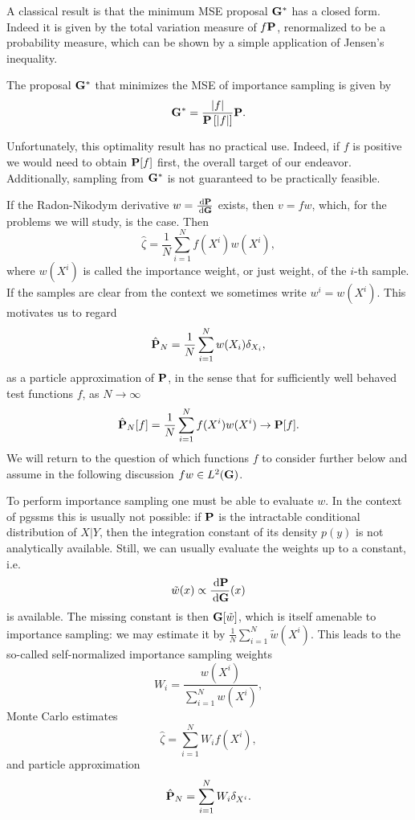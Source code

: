A classical result is that the minimum MSE proposal $\G^\ast$ has a closed form. Indeed it is given by the total variation measure of $f\P$, renormalized to be a probability measure, which can be shown by a simple application of Jensen's inequality. 
\begin{proposition}
    \label{prop:minimum_MSE_IS}
    The proposal $\G^{\ast}$ that minimizes the MSE of importance sampling is given by
    $$
    \G^{\ast}  = \frac{\lvert f \rvert}{\P\left[\lvert f \rvert \right]} \P.
    $$
\end{proposition}
Unfortunately, this optimality result has no practical use. Indeed, if $f$ is positive we would need to obtain $\P[f]$ first, the overall target of our endeavor. Additionally, sampling from $\G^{\ast}$ is not guaranteed to be practically feasible. 

If the Radon-Nikodym derivative $w = \frac{\d\P}{\d\G}$ exists, then $v = fw$, which, for the problems we will study, is the case. Then 
$$
\hat \zeta = \frac{1}{N} \sum_{i = 1}^N f(X^{i})w(X^{i}),
$$
where $w(X^{i})$ is called the importance weight, or just weight, of the $i$-th sample. If the samples are clear from the context we sometimes write $w^{i} = w(X^{i})$. 
This motivates us to regard
\begin{align}
\label{eq:is-particle-approximation}
\hat \P_N = \frac{1}{N} \sum_{i = 1}^{N} w(X_i) \delta_{X_i},
\end{align}
as a particle approximation of $\P$, in the sense that for sufficiently well behaved test functions $f$, as $N \to \infty$ $$
\hat\P_{N}[f] = \frac{1}{N} \sum_{i = 1}^N f(X^{i})w(X^{i})\to \P [f].
$$
We will return to the question of which functions $f$ to consider further below and assume in the following discussion $fw \in L^{2}(\G)$.

To perform importance sampling one must be able to evaluate $w$. In the context of \glspl{pgssm} this is usually not possible: if $\P$ is the intractable conditional distribution of $X|Y$, then the integration constant of its density $p(y)$ is not analytically available.
Still, we can usually evaluate the weights up to a constant, i.e. $$\tilde w(x) \propto \frac{\d \P}{\d \G}(x)$$ is available. The missing constant is then $\G [\tilde w]$, which is itself amenable to importance sampling: we may estimate it by $\frac{1}{N}\sum_{i = 1}^N \tilde w(X^{i})$.
This leads to the so-called self-normalized importance sampling weights 
$$W_i = \frac{w(X^i)}{\sum_{i = 1}^N w(X^i)},$$
Monte Carlo estimates 
$$\hat \zeta = \sum_{i = 1}^{N} W_i f(X^i),$$
and particle approximation 
$$\hat \P_N = \sum_{i = 1}^{N} W_i \delta_{X^i}.$$

